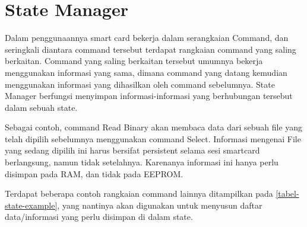 \chapter{State Manager}
\label{chap_state}

Dalam penggunaannya smart card bekerja dalam serangkaian Command, dan seringkali diantara command tersebut terdapat rangkaian command yang saling berkaitan. Command yang saling berkaitan tersebut umumnya bekerja menggunakan informasi yang sama, dimana command yang datang kemudian menggunakan informasi yang dihasilkan oleh command sebelumnya. State Manager berfungsi menyimpan informasi-informasi yang berhubungan tersebut dalam sebuah state.

Sebagai contoh, command Read Binary akan membaca data dari sebuah file yang telah dipilih sebelumnya menggunakan command Select. Informasi mengenai File yang sedang dipilih ini harus bersifat persistent selama sesi smartcard berlangsung, namun tidak setelahnya. Karenanya informasi ini hanya perlu disimpan pada RAM, dan tidak pada EEPROM.

Terdapat beberapa contoh rangkaian command lainnya ditampilkan pada \ref{tabel-state-example}, yang nantinya akan digunakan untuk menyusun daftar data/informasi yang perlu disimpan di dalam state.

